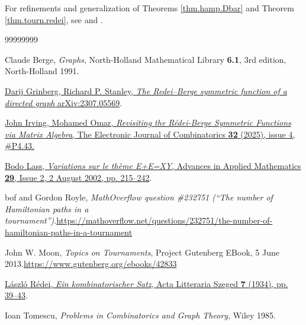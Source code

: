 \documentclass[numbers=enddot,12pt,final,onecolumn,notitlepage]{scrartcl}%
\numberwithin{exer}{subsection}
\theoremstyle{definition}
\begin{document}
For refinements and generalization of Theorems \ref{thm.hamp.Dbar} and Theorem
\ref{thm.tourn.redei}, see \cite{GriSta23} and \cite{IrvOma25}.

\begin{thebibliography}{99999999}                                                                                         %


Claude Berge, \textit{Graphs}, North-Holland
Mathematical Library \textbf{6.1}, 3rd edition, North-Holland 1991.

\href{https://arxiv.org/abs/2307.05569}{Darij
Grinberg, Richard P. Stanley, \textit{The Redei--Berge symmetric function of a
directed graph} arXiv:2307.05569}.

\href{https://doi.org/10.37236/13841}{John Irving,
Mohamed Omar, \textit{Revisiting the R\'{e}dei-Berge Symmetric Functions via
Matrix Algebra}, The Electronic Journal of Combinatorics \textbf{32} (2025),
issue 4, \#P4.43.}

%
\href{https://doi.org/10.1016/S0196-8858(02)00010-6}{Bodo Lass,
\textit{Variations sur le th\`{e}me E+E=XY}, Advances in Applied Mathematics
\textbf{29}, Issue 2, 2 August 2002, pp. 215--242}.

bof and Gordon Royle, \textit{MathOverflow
question \#232751 (\textquotedblleft The number of Hamiltonian paths in a
tournament\textquotedblright)}.\newline\url{https://mathoverflow.net/questions/232751/the-number-of-hamiltonian-paths-in-a-tournament}

John W. Moon, \textit{Topics on Tournaments}, Project
Gutenberg EBook, 5 June 2013.\newline\url{https://www.gutenberg.org/ebooks/42833}

%
\href{http://acta.bibl.u-szeged.hu/13432/}{L\'{a}szl\'{o} R\'{e}dei,
\textit{Ein kombinatorischer Satz}, Acta Litteraria Szeged \textbf{7} (1934),
pp. 39--43}.

Ioan Tomescu, \textit{Problems in Combinatorics
and Graph Theory}, Wiley 1985.
\end{thebibliography}
\end{document}
